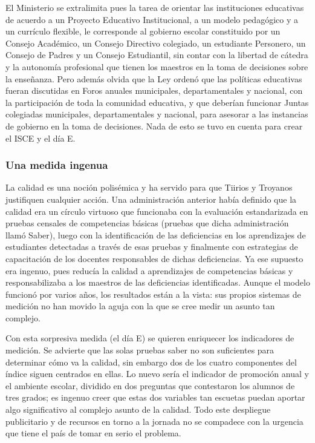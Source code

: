 \documentclass[10pt]{article}
\begin{document}
El Ministerio se extralimita pues la tarea de orientar las instituciones educativas de acuerdo a un Proyecto Educativo Institucional, a un modelo pedagógico y a un currículo flexible, le corresponde al gobierno escolar constituido por un Consejo Académico, un Consejo Directivo colegiado, un estudiante Personero, un Consejo de Padres y un Consejo Estudiantil, sin contar con la libertad de cátedra y la
autonomía profesional que tienen los maestros en la toma de decisiones sobre la enseñanza. Pero además olvida que la Ley ordenó que las políticas educativas fueran discutidas en Foros anuales municipales, departamentales y nacional, con la participación de toda la comunidad educativa, y que deberían funcionar Juntas colegiadas municipales, departamentales y nacional, para asesorar a las instancias de gobierno en la toma de decisiones. Nada de esto se tuvo en cuenta para crear el ISCE y el día E.
\subsubsection*{Una medida ingenua}
La calidad es una noción polisémica y ha servido para que Tiirios y Troyanos justifiquen cualquier acción. Una administración anterior había definido que la calidad era un círculo virtuoso que funcionaba con la evaluación estandarizada en pruebas censales de competencias básicas (pruebas que dicha administración llamó Saber), luego con la identificación de las deficiencias en los aprendizajes de estudiantes detectadas a través de esas pruebas y finalmente con estrategias de capacitación de los docentes responsables de dichas deficiencias. Ya ese supuesto era ingenuo, pues reducía la calidad a aprendizajes de competencias básicas y responsabilizaba a los maestros de las deficiencias identificadas. Aunque el modelo funcionó por varios años, los resultados están a la vista: sus propios sistemas de medición no han movido la aguja con la que se cree medir un asunto tan complejo.

Con esta sorpresiva medida (el día E) se quieren enriquecer los indicadores de medición. Se advierte que las solas pruebas saber no son suficientes para determinar cómo va la calidad, sin embargo dos de los cuatro componentes del índice siguen centrados en ellas. Lo nuevo sería el indicador de promoción anual y el ambiente escolar, dividido en dos preguntas que contestaron los alumnos de tres grados; es ingenuo creer que estas dos variables tan escuetas puedan aportar algo significativo al complejo asunto de la calidad. Todo este despliegue publicitario y de recursos en torno a la jornada no se compadece con la urgencia que tiene el país de tomar en serio el problema.
\end{document}
